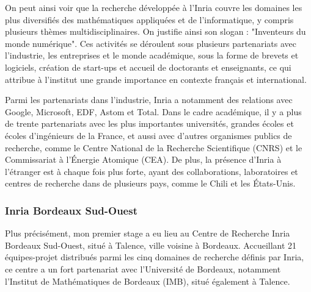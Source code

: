 \indent On peut ainsi voir que la recherche développée à l'Inria couvre les domaines les plus diversifiés des mathématiques appliquées et de l'informatique, y compris plusieurs thèmes multidisciplinaires. On justifie ainsi son slogan : "Inventeurs du monde numérique". Ces activités se déroulent sous plusieurs partenariats avec l'industrie, les entreprises et le monde académique, sous la forme de brevets et logiciels, création de start-ups et accueil de doctorants et enseignants, ce qui attribue à l'institut une grande importance en contexte français et international.

\indent Parmi les partenariats dans l'industrie, Inria a notamment des relations avec Google, Microsoft, EDF, Astom et Total. Dans le cadre académique, il y a plus de trente partenariats avec les plus importantes universités, grandes écoles et écoles d'ingénieurs de la France, et aussi avec d'autres organismes publics de recherche, comme le Centre National de la Recherche Scientifique (CNRS) et le Commissariat à l'Énergie Atomique (CEA). De plus, la présence d'Inria à l'étranger est à chaque fois plus forte, ayant des collaborations, laboratoires et centres de recherche dans de plusieurs pays, comme le Chili et les États-Unis.


\subsubsection{Inria Bordeaux Sud-Ouest}

\indent Plus précisément, mon premier stage a eu lieu au Centre de Recherche Inria Bordeaux Sud-Ouest, situé à Talence, ville voisine à Bordeaux. Accueillant 21 équipes-projet distribués parmi les cinq domaines de recherche définis par Inria, ce centre a un fort partenariat avec l'Université de Bordeaux, notamment l'Institut de Mathématiques de Bordeaux (IMB), situé également à Talence.

